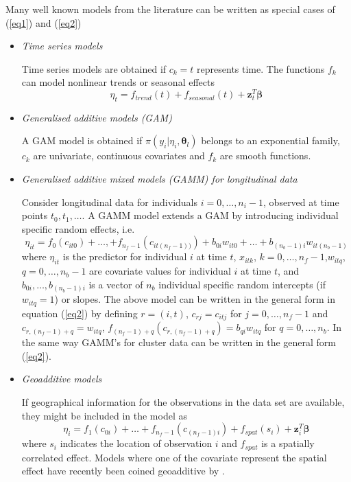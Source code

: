 \documentclass[a4paper,11pt]{article}
\def\mm#1{\ensuremath{\boldsymbol{#1}}} %
\begin{document}
Many well known models from the literature can be written as special
cases of (\ref{eq1}) and (\ref{eq2})
\begin{itemize}
\item {\it Time series models}

    Time series models are obtained if $c_k=t$ represents time. The
    functions $f_k$ can model nonlinear trends or seasonal effects
    \[\eta_t=f_{trend}(t)+f_{seasonal}(t)+\mm{z}_t^T\mm{\beta}\]
  
\item {\it Generalised additive models (GAM)}
    
    A GAM model is obtained if $\pi(y_i|\eta_i,\mm{\theta}_l)$ belongs
    to an exponential family, $c_k$ are univariate, continuous
    covariates and $f_k$ are smooth functions.
    
\item {\it Generalised additive mixed models (GAMM) for longitudinal
        data}

    Consider longitudinal data for individuals $i=0,\dots,n_i-1$,
    observed at time points $t_0,t_1,\dots$. A GAMM model extends a
    GAM by introducing individual specific random effects, i.e.
    \[\eta_{it}=f_0(c_{it0})+\dots,+f_{n_f-1}(c_{it(n_f-1))})+b_{0i}w_{it0}+\dots+b_{(n_b-1)i}w_{it(n_b-1)}\]
    where $\eta_{it}$ is the predictor for individual $i$ at time $t$,
    $x_{itk}$, $k=0,\dots,n_f-1$,$w_{itq}$, $q=0,\dots,n_b-1$ are
    covariate values for individual $i$ at time $t$, and
    $b_{0i},\dots,b_{(n_b-1)i}$ is a vector of $n_b$ individual
    specific random intercepts (if $w_{itq}=1$) or slopes. The above
    model can be written in the general form in equation (\ref{eq2}) by
    defining $r=(i,t)$, $c_{rj}=c_{itj}$ for $j=0,\dots,n_f-1$ and
    $c_{r,(n_f-1)+q}=w_{itq}$,
    $f_{(n_f-1)+q}(c_{r,(n_f-1)+q})=b_{qi}w_{itq}$ for
    $q=0,\dots,n_b$. In the same way GAMM's for cluster data can be
    written in the general form (\ref{eq2}).
    
\item {\it Geoadditive models}

    If geographical information for the observations in the data set
    are available, they might be included in the model as
    \[\eta_i=f_1(c_{0i})+\dots+f_{n_f-1}(c_{(n_f-1)i})+f_{spat}(s_i)+\mm{z}_i^T\mm{\beta}\]
    where $s_i$ indicates the location of observation $i$ and
    $f_{spat}$ is a spatially correlated effect. Models where one of
    the covariate represent the spatial effect have recently been
    coined geoadditive by \cite{art270}.
    

\end{itemize}
\end{document}
